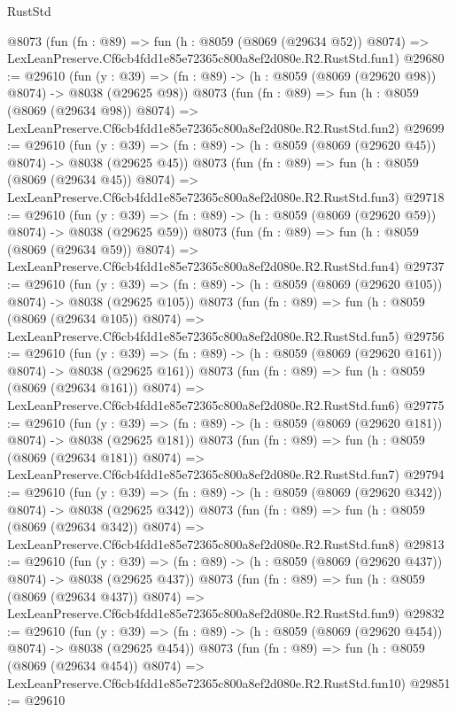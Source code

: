 \begin{lexlean}{RustStd}
\begin{coremodule}
    @8073
    (fun (fn : @89) =>
    fun (h : @8059 (@8069 (@29634 @52)) @8074) =>
    LexLeanPreserve.Cf6cb4fdd1e85e72365c800a8ef2d080e.R2.RustStd.fun1)
@29680 := @29610
    (fun (y : @39) => (fn : @89) -> (h : @8059 (@8069 (@29620 @98)) @8074) -> @8038 (@29625 @98))
    @8073
    (fun (fn : @89) =>
    fun (h : @8059 (@8069 (@29634 @98)) @8074) =>
    LexLeanPreserve.Cf6cb4fdd1e85e72365c800a8ef2d080e.R2.RustStd.fun2)
@29699 := @29610
    (fun (y : @39) => (fn : @89) -> (h : @8059 (@8069 (@29620 @45)) @8074) -> @8038 (@29625 @45))
    @8073
    (fun (fn : @89) =>
    fun (h : @8059 (@8069 (@29634 @45)) @8074) =>
    LexLeanPreserve.Cf6cb4fdd1e85e72365c800a8ef2d080e.R2.RustStd.fun3)
@29718 := @29610
    (fun (y : @39) => (fn : @89) -> (h : @8059 (@8069 (@29620 @59)) @8074) -> @8038 (@29625 @59))
    @8073
    (fun (fn : @89) =>
    fun (h : @8059 (@8069 (@29634 @59)) @8074) =>
    LexLeanPreserve.Cf6cb4fdd1e85e72365c800a8ef2d080e.R2.RustStd.fun4)
@29737 := @29610
    (fun (y : @39) => (fn : @89) -> (h : @8059 (@8069 (@29620 @105)) @8074) -> @8038 (@29625 @105))
    @8073
    (fun (fn : @89) =>
    fun (h : @8059 (@8069 (@29634 @105)) @8074) =>
    LexLeanPreserve.Cf6cb4fdd1e85e72365c800a8ef2d080e.R2.RustStd.fun5)
@29756 := @29610
    (fun (y : @39) => (fn : @89) -> (h : @8059 (@8069 (@29620 @161)) @8074) -> @8038 (@29625 @161))
    @8073
    (fun (fn : @89) =>
    fun (h : @8059 (@8069 (@29634 @161)) @8074) =>
    LexLeanPreserve.Cf6cb4fdd1e85e72365c800a8ef2d080e.R2.RustStd.fun6)
@29775 := @29610
    (fun (y : @39) => (fn : @89) -> (h : @8059 (@8069 (@29620 @181)) @8074) -> @8038 (@29625 @181))
    @8073
    (fun (fn : @89) =>
    fun (h : @8059 (@8069 (@29634 @181)) @8074) =>
    LexLeanPreserve.Cf6cb4fdd1e85e72365c800a8ef2d080e.R2.RustStd.fun7)
@29794 := @29610
    (fun (y : @39) => (fn : @89) -> (h : @8059 (@8069 (@29620 @342)) @8074) -> @8038 (@29625 @342))
    @8073
    (fun (fn : @89) =>
    fun (h : @8059 (@8069 (@29634 @342)) @8074) =>
    LexLeanPreserve.Cf6cb4fdd1e85e72365c800a8ef2d080e.R2.RustStd.fun8)
@29813 := @29610
    (fun (y : @39) => (fn : @89) -> (h : @8059 (@8069 (@29620 @437)) @8074) -> @8038 (@29625 @437))
    @8073
    (fun (fn : @89) =>
    fun (h : @8059 (@8069 (@29634 @437)) @8074) =>
    LexLeanPreserve.Cf6cb4fdd1e85e72365c800a8ef2d080e.R2.RustStd.fun9)
@29832 := @29610
    (fun (y : @39) => (fn : @89) -> (h : @8059 (@8069 (@29620 @454)) @8074) -> @8038 (@29625 @454))
    @8073
    (fun (fn : @89) =>
    fun (h : @8059 (@8069 (@29634 @454)) @8074) =>
    LexLeanPreserve.Cf6cb4fdd1e85e72365c800a8ef2d080e.R2.RustStd.fun10)
@29851 := @29610

\end{coremodule}
\end{lexlean}
